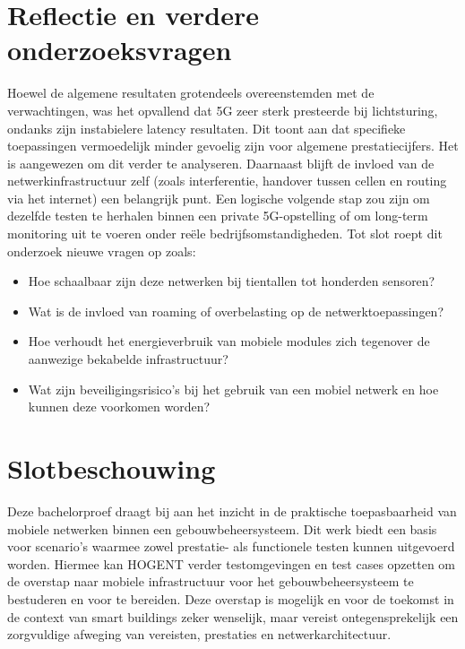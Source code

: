 \section{Reflectie en verdere onderzoeksvragen}
Hoewel de algemene resultaten grotendeels overeenstemden met de verwachtingen, was het opvallend dat 5G zeer sterk presteerde bij lichtsturing, ondanks zijn instabielere latency resultaten. Dit toont aan dat specifieke toepassingen vermoedelijk minder gevoelig zijn voor algemene prestatiecijfers. Het is aangewezen om dit verder te analyseren.  Daarnaast blijft de invloed van de netwerkinfrastructuur zelf (zoals interferentie, handover tussen cellen en routing via het internet) een belangrijk punt. Een logische volgende stap zou zijn om dezelfde testen te herhalen binnen een private 5G-opstelling of om long-term monitoring uit te voeren onder reële bedrijfsomstandigheden.
Tot slot roept dit onderzoek nieuwe vragen op zoals: 
\begin{itemize}
    \item Hoe schaalbaar zijn deze netwerken bij tientallen tot honderden sensoren?
    \item Wat is de invloed van roaming of overbelasting op de netwerktoepassingen?
    \item Hoe verhoudt het energieverbruik van mobiele modules zich tegenover de aanwezige bekabelde infrastructuur?
    \item Wat zijn beveiligingsrisico’s bij het gebruik van een mobiel netwerk en hoe kunnen deze voorkomen worden?
\end{itemize}

\section{Slotbeschouwing}
Deze bachelorproef draagt bij aan het inzicht in de praktische toepasbaarheid van mobiele netwerken binnen een gebouwbeheersysteem. Dit werk biedt een basis voor scenario’s waarmee zowel prestatie- als functionele testen kunnen uitgevoerd worden. Hiermee kan HOGENT verder testomgevingen en test cases opzetten om de overstap naar mobiele infrastructuur  voor het gebouwbeheersysteem te bestuderen en voor te bereiden. Deze overstap is mogelijk en voor de toekomst in de context van smart buildings zeker wenselijk, maar vereist ontegensprekelijk een zorgvuldige afweging van vereisten, prestaties en netwerkarchitectuur.

